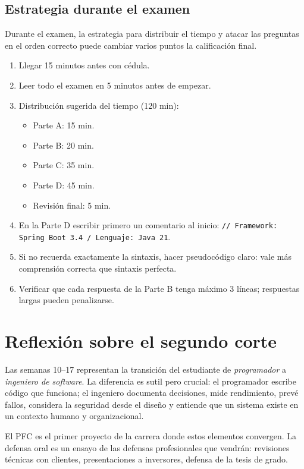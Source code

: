 \documentclass[11pt,a4paper,openany]{book}
\begin{document}
\subsection{Estrategia durante el examen}

Durante el examen, la estrategia para distribuir el tiempo
y atacar las preguntas en el orden correcto puede cambiar varios
puntos la calificación final.


\begin{enumerate}
\item Llegar 15 minutos antes con cédula.
\item Leer todo el examen en 5 minutos antes de empezar.
\item Distribución sugerida del tiempo (120 min):
\begin{itemize}
\item Parte A: 15 min.
\item Parte B: 20 min.
\item Parte C: 35 min.
\item Parte D: 45 min.
\item Revisión final: 5 min.
\end{itemize}
\item En la Parte D escribir primero un comentario al inicio:
\texttt{// Framework: Spring Boot 3.4 / Lenguaje: Java 21}.
\item Si no recuerda exactamente la sintaxis, hacer pseudocódigo
claro: vale más comprensión correcta que sintaxis perfecta.
\item Verificar que cada respuesta de la Parte B tenga máximo 3
líneas; respuestas largas pueden penalizarse.
\end{enumerate}

\section{Reflexión sobre el segundo corte}

Las semanas 10--17 representan la transición del estudiante de
\emph{programador} a \emph{ingeniero de software}. La diferencia es
sutil pero crucial: el programador escribe código que funciona; el
ingeniero documenta decisiones, mide rendimiento, prevé fallos,
considera la seguridad desde el diseño y entiende que un sistema
existe en un contexto humano y organizacional.

El PFC es el primer proyecto de la carrera donde estos elementos
convergen. La defensa oral es un ensayo de las defensas profesionales
que vendrán: revisiones técnicas con clientes, presentaciones a
inversores, defensa de la tesis de grado.
\end{document}
